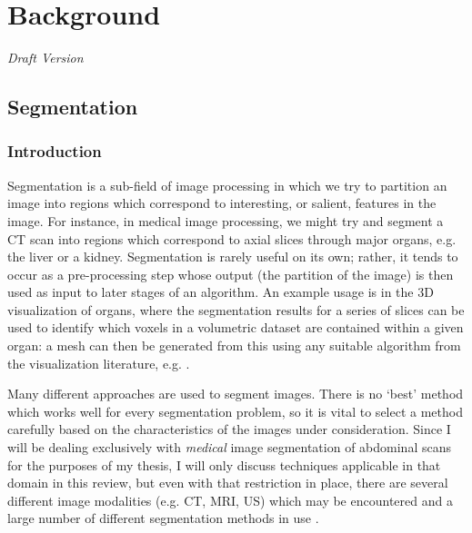 \chapter{Background}

\emph{Draft Version}

\section{Segmentation}

\subsection{Introduction}

Segmentation is a sub-field of image processing in which we try to partition an image into regions which correspond to interesting, or salient, features in the image. For instance, in medical image processing, we might try and segment a CT scan into regions which correspond to axial slices through major organs, e.g. the liver or a kidney. Segmentation is rarely useful on its own; rather, it tends to occur as a pre-processing step whose output (the partition of the image) is then used as input to later stages of an algorithm. An example usage is in the 3D visualization of organs, where the segmentation results for a series of slices can be used to identify which voxels in a volumetric dataset are contained within a given organ: a mesh can then be generated from this using any suitable algorithm from the visualization literature, e.g. \cite{cong05,lorensen87,wu03}.

Many different approaches are used to segment images. There is no `best' method which works well for every segmentation problem, so it is vital to select a method carefully based on the characteristics of the images under consideration. Since I will be dealing exclusively with \emph{medical} image segmentation of abdominal scans for the purposes of my thesis, I will only discuss techniques applicable in that domain in this review, but even with that restriction in place, there are several different image modalities (e.g. CT, MRI, US) which may be encountered and a large number of different segmentation methods in use \cite{pham00,varshney02}.

